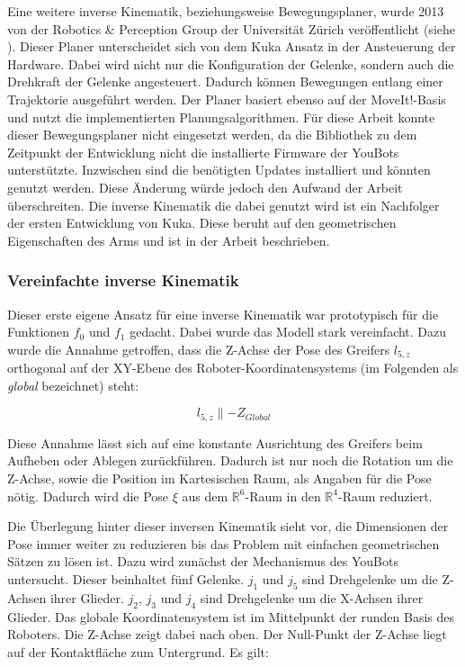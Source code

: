 Eine weitere inverse Kinematik, beziehungsweise Bewegungsplaner, wurde 2013 von der Robotics \& Perception Group der Universität Zürich veröffentlicht (siehe \cite{muggler2013torque}). Dieser Planer unterscheidet sich von dem Kuka Ansatz in der Ansteuerung der Hardware. Dabei wird nicht nur die Konfiguration der Gelenke, sondern auch die  Drehkraft der Gelenke angesteuert. Dadurch können Bewegungen entlang einer Trajektorie ausgeführt werden. Der Planer basiert ebenso auf der MoveIt!-Basis und nutzt die implementierten Planungsalgorithmen. Für diese Arbeit konnte dieser Bewegungsplaner nicht eingesetzt werden, da die Bibliothek zu dem Zeitpunkt der Entwicklung nicht die installierte Firmware der YouBots unterstützte. Inzwischen sind die benötigten Updates installiert und könnten genutzt werden. Diese Änderung würde jedoch den Aufwand der Arbeit überschreiten. Die inverse Kinematik die dabei genutzt wird ist ein Nachfolger der ersten Entwicklung von Kuka. Diese beruht auf den geometrischen Eigenschaften des Arms und ist in der Arbeit \cite{6309496} beschrieben.

\subsubsection{Vereinfachte inverse Kinematik}
Dieser erste eigene Ansatz für eine inverse Kinematik war prototypisch für die Funktionen $f_0$ und $f_1$ gedacht. Dabei wurde das Modell stark vereinfacht. Dazu wurde die Annahme getroffen, dass die Z-Achse der Pose des Greifers $l_{5,z}$ orthogonal auf der XY-Ebene des Roboter-Koordinatensystems (im Folgenden als \textit{global} bezeichnet) steht:

\begin{equation}
l_{5,z} \parallel -Z_{Global}
\label{eq:1}
\end{equation}


Diese Annahme lässt sich auf eine konstante Ausrichtung des Greifers beim Aufheben oder Ablegen zurückführen. Dadurch ist nur noch die Rotation um die Z-Achse, sowie die Position im Kartesischen Raum, als Angaben für die Pose nötig. Dadurch wird die Pose $\xi$ aus dem $ \mathbb{R}^6 $-Raum in den $ \mathbb{R}^4 $-Raum reduziert.

Die Überlegung hinter dieser inversen Kinematik sieht vor, die Dimensionen der Pose immer weiter zu reduzieren bis das Problem mit einfachen geometrischen Sätzen zu lösen ist. Dazu wird zunächst der Mechanismus des YouBots untersucht. Dieser beinhaltet fünf Gelenke. $j_1$ und $j_5$ sind Drehgelenke um die Z-Achsen ihrer Glieder. $j_2$, $j_3$ und $j_4$ sind Drehgelenke um die X-Achsen ihrer Glieder. Das globale Koordinatensystem ist im Mittelpunkt der runden Basis des Roboters. Die Z-Achse zeigt dabei nach oben. Der Null-Punkt der Z-Achse liegt auf der Kontaktfläche zum Untergrund. Es gilt:

